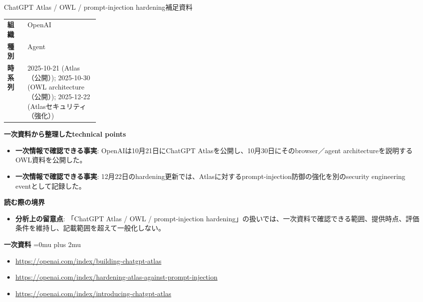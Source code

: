 \begin{technicalnote}{ChatGPT Atlas / OWL / prompt-injection hardening}{補足資料}
\begingroup
\begin{tabularx}{\linewidth}{@{}>{\bfseries}p{0.22\linewidth}X@{}}
組織 & OpenAI \\
種別 & Agent \\
時系列 & 2025-10-21 (Atlas（公開）); 2025-10-30 (OWL architecture（公開）); 2025-12-22 (Atlasセキュリティ（強化）) \\
\end{tabularx}
\smallskip
{\bfseries 一次資料から整理したtechnical points}
\begin{itemize}[leftmargin=1.5em,itemsep=0.35em]
\item \textbf{一次情報で確認できる事実}: OpenAIは10月21日にChatGPT Atlasを公開し、10月30日にそのbrowser／agent architectureを説明するOWL資料を公開した。
\item \textbf{一次情報で確認できる事実}: 12月22日のhardening更新では、Atlasに対するprompt-injection防御の強化を別のsecurity engineering eventとして記録した。
\end{itemize}
\begin{minipage}{\linewidth}
{\bfseries 読む際の境界}
\begin{itemize}[leftmargin=1.5em,itemsep=0.35em]
\item \textbf{分析上の留意点}: 「ChatGPT Atlas / OWL / prompt-injection hardening」の扱いでは、一次資料で確認できる範囲、提供時点、評価条件を維持し、記載範囲を超えて一般化しない。
\end{itemize}
\begin{samepage}
{\bfseries 一次資料}
\begingroup\sloppy
\Urlmuskip=0mu plus 2mu\relax
\begin{itemize}[leftmargin=1.5em,itemsep=0.25em]
\item {\scriptsize\url{https://openai.com/index/building-chatgpt-atlas}}
\item {\scriptsize\url{https://openai.com/index/hardening-atlas-against-prompt-injection}}
\item {\scriptsize\url{https://openai.com/index/introducing-chatgpt-atlas}}
\end{itemize}
\endgroup
\end{samepage}
\end{minipage}
\endgroup
\end{technicalnote}
\medskip

